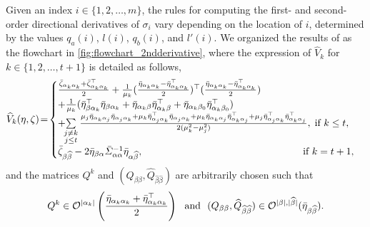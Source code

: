 Given an index $i \in \{1, 2, \ldots, m\}$, the rules for computing the first- and second-order directional derivatives of $\sigma_i$ vary depending on the location of $i$, determined by the values $q_a(i)$, $l(i)$, $q_b(i)$, and $l'(i)$. We organized the results of \cite[Theorem 3.1]{zhang2013secondordersingular} as the flowchart in \myfig\ref{fig:flowchart_2ndderivative}, where the expression of $\widehat{V}_k$ for $k\in\{1,2,\ldots,t+1\}$ is detailed as follows,
\begin{equation*}\label{eq:widehatV}
    \widehat{V}_k(\eta,\zeta)\!=\!\begin{cases}
	\frac{\barzeta_{\alpha_k\alpha_k}+\barzeta^\top_{\alpha_k\alpha_k}}{2}+\frac{1}{\mu_k}(\frac{\bareta_{\alpha_k\alpha_k}-\bareta^\top_{\alpha_k\alpha_k}}{2})^\top(\frac{\bareta_{\alpha_k\alpha_k}-\bareta^\top_{\alpha_k\alpha_k}}{2})
    \\
    +\frac{1}{\mu_k}(\bareta^\top_{\beta\alpha_k}\bareta_{\beta\alpha_k}+\bareta_{\alpha_k\beta}\bareta^\top_{\alpha_k\beta}+\bareta_{\alpha_k\beta_0}\bareta^\top_{\alpha_k\beta_0})
    \\
    +\!\!\sum\limits_{\substack{j \ne k \\ j \le t}}\frac{\mu_j\bareta_{\alpha_k\alpha_j}\bareta_{\alpha_j\alpha_k}+\mu_k\bareta^\top_{\alpha_j\alpha_k}\bareta_{\alpha_j\alpha_k}+\mu_k\bareta_{\alpha_k\alpha_j}\bareta^\top_{\alpha_k\alpha_j}+\mu_j\bareta^\top_{\alpha_j\alpha_k}\bareta^\top_{\alpha_k\alpha_j}}{2(\mu_k^2-\mu_j^2)}, \hspace{1mm} \text{if}\ k\le t,
    \\[1mm]
    \barzeta_{\beta\widehat{\beta}}-2\bareta_{\beta\alpha}\bar{\varSigma}^{-1}_{\alpha\alpha}\bareta_{\alpha\widehat{\beta}},\hspace{57mm} \text{if}\ k=t+1,
    \end{cases}
\end{equation*}
and the matrices $Q^k$ and $(Q_{\beta\beta},\widehat{Q}_{\widehat{\beta}\widehat{\beta}})$ are arbitrarily chosen such that
\begin{equation}\label{eq:choseQ}
    Q^k\in\orth^{|\alpha_k|}\kh{\frac{\bareta_{\alpha_k\alpha_k}+\bareta_{\alpha_k\alpha_k}^\top}{2}}\ \ \text{and}\ \ (Q_{\beta\beta},\widehat{Q}_{\widehat{\beta}\widehat{\beta}})\in\orth^{|\beta|,|\widehat{\beta}|}(\bareta_{\beta\widehat{\beta}}).
\end{equation} 



